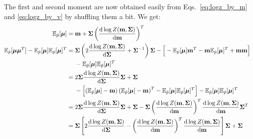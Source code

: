 \documentclass[11pt]{article}
\newcommand{\vek}[1]{\ensuremath{\mathbf{#1}}}
\newcommand{\byd}{\ensuremath{\mathrm{d}}}
\newcommand{\ee}{\ensuremath{\mathbb{E}}}
\begin{document}
The first and second moment are now obtained easily from 
Eqs.~\eqref{eq:logz_by_m} and \eqref{eq:logz_by_v} by shuffling them 
a bit. We get:
\begin{align}
	\ee_{\hat{p}}[\boldsymbol{\mu}] &= \vek{m} +
		\vek{\Sigma}\left(\frac{\byd\log Z(\vek{m}, \vek{\Sigma})}{\byd\vek{m}}\right)^T
		\label{eq:minimiser_mean}
		\\
	\ee_{\hat{p}}[\boldsymbol{\mu}\boldsymbol{\mu}^T] - \ee_{\hat{p}}[\boldsymbol{\mu}]\ee_{\hat{p}}[\boldsymbol{\mu}]^T
		&=
		\vek{\Sigma}\left(2\frac{\byd\log Z(\vek{m}, \vek{\Sigma})}{\byd \vek{\Sigma}}
									 + \vek{\Sigma}^{-1}\right)\vek{\Sigma}
				 - \Big[-\ee_{\hat{p}}[\boldsymbol{\mu}]\vek{m}^T
				        -\vek{m}\ee_{\hat{p}}[\boldsymbol{\mu}]^T
				        +\vek{m}\vek{m}\Big]\notag\\
		&\hphantom{=|}\mbox{}
			- \ee_{\hat{p}}[\boldsymbol{\mu}]\ee_{\hat{p}}[\boldsymbol{\mu}]^T\\
		&=
		2\vek{\Sigma}\frac{\byd\log Z(\vek{m}, \vek{\Sigma})}{\byd \vek{\Sigma}}\vek{\Sigma} 
				 + \vek{\Sigma}\notag\\
		&\hphantom{=|}\mbox{}
			- \left[\left(\ee_{\hat{p}}[\boldsymbol{\mu}] - \vek{m}\right)
							\left(\ee_{\hat{p}}[\boldsymbol{\mu}] - \vek{m}\right)^T
							- \ee_{\hat{p}}[\boldsymbol{\mu}]\ee_{\hat{p}}[\boldsymbol{\mu}]^T\right]
			- \ee_{\hat{p}}[\boldsymbol{\mu}]\ee_{\hat{p}}[\boldsymbol{\mu}]^T\\
		&=
		2\vek{\Sigma}\frac{\byd\log Z(\vek{m}, \vek{\Sigma})}{\byd \vek{\Sigma}}\vek{\Sigma} + \vek{\Sigma}
			- \vek{\Sigma}\left(\frac{\byd\log Z(\vek{m}, \vek{\Sigma})}{\byd\vek{m}}\right)^T
				\frac{\byd\log Z(\vek{m}, \vek{\Sigma})}{\byd\vek{m}}\vek{\Sigma}^T\\
		&=
		\vek{\Sigma}\left[
		2\frac{\byd\log Z(\vek{m}, \vek{\Sigma})}{\byd \vek{\Sigma}}
			- \left(\frac{\byd\log Z(\vek{m}, \vek{\Sigma})}{\byd\vek{m}}\right)^T
				\frac{\byd\log Z(\vek{m}, \vek{\Sigma})}{\byd\vek{m}}\right]\vek{\Sigma}
			+ \vek{\Sigma}
		\label{eq:minimiser_var}
\end{align}
\end{document}
